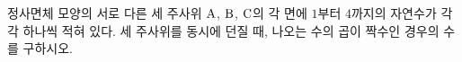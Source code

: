 정사면체 모양의 서로 다른 세 주사위 $\mathrm{A}$, $\mathrm{B}$, $\mathrm{C}$의 각 면에 $1$부터 $4$까지의 자연수가 각각 하나씩 적혀 있다. 세 주사위를 동시에 던질 때, 나오는 수의 곱이 짝수인 경우의 수를 구하시오.
